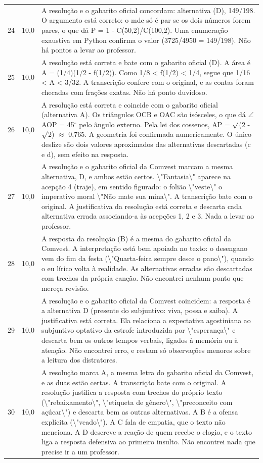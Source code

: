 \documentclass{article}%
\begin{document}
\begin{longtable}{@{}c c p{}@{}}
24 & 10,0 & A resolução e o gabarito oficial concordam: alternativa (D), 149/198. O argumento está correto: o mdc só é par se os dois números forem pares, o que dá P = 1 - C(50,2)/C(100,2). Uma enumeração exaustiva em Python confirma o valor (3725/4950 = 149/198). Não há pontos a levar ao professor. \\
25 & 10,0 & A resolução está correta e bate com o gabarito oficial (D). A área é A = (1/4)(1/2 - f(1/2)). Como 1/8 < f(1/2) < 1/4, segue que 1/16 < A < 3/32. A transcrição confere com o original, e as contas foram checadas com frações exatas. Não há ponto duvidoso. \\
26 & 10,0 & A resolução está correta e coincide com o gabarito oficial (alternativa A). Os triângulos OCB e OAC são isósceles, o que dá $\angle$AOP = 45$^\circ$ pelo ângulo externo. Pela lei dos cossenos, AP = $\surd$(2 - $\surd$2) $\approx$ 0,765. A geometria foi confirmada numericamente. O único deslize são dois valores aproximados das alternativas descartadas (c e d), sem efeito na resposta. \\
27 & 10,0 & A resolução e o gabarito oficial da Comvest marcam a mesma alternativa, D, e ambos estão certos. \textbackslash{}"Fantasia\textbackslash{}" aparece na acepção 4 (traje), em sentido figurado: o folião \textbackslash{}"veste\textbackslash{}" o imperativo moral \textbackslash{}"Não mate sua mina\textbackslash{}". A transcrição bate com o original. A justificativa da resolução está correta e descarta cada alternativa errada associando{-}a às acepções 1, 2 e 3. Nada a levar ao professor. \\
28 & 10,0 & A resposta da resolução (B) é a mesma do gabarito oficial da Comvest. A interpretação está bem apoiada no texto: o desengano vem do fim da festa (\textbackslash{}"Quarta{-}feira sempre desce o pano\textbackslash{}"), quando o eu lírico volta à realidade. As alternativas erradas são descartadas com trechos da própria canção. Não encontrei nenhum ponto que mereça revisão. \\
29 & 10,0 & A resolução e o gabarito oficial da Comvest coincidem: a resposta é a alternativa D (presente do subjuntivo: viva, possa e saiba). A justificativa está correta. Ela relaciona a expectativa agostiniana ao subjuntivo optativo da estrofe introduzida por \textbackslash{}"esperança\textbackslash{}" e descarta bem os outros tempos verbais, ligados à memória ou à atenção. Não encontrei erro, e restam só observações menores sobre a leitura dos distratores. \\
30 & 10,0 & A resolução marca A, a mesma letra do gabarito oficial da Comvest, e as duas estão certas. A transcrição bate com o original. A resolução justifica a resposta com trechos do próprio texto (\textbackslash{}"rebaixamento\textbackslash{}", \textbackslash{}"etiqueta de gênero\textbackslash{}", \textbackslash{}"preconceito com açúcar\textbackslash{}") e descarta bem as outras alternativas. A B é a ofensa explícita (\textbackslash{}"veado\textbackslash{}"). A C fala de empatia, que o texto não menciona. A D descreve a reação de quem recebe o elogio, e o texto liga a resposta defensiva ao primeiro insulto. Não encontrei nada que precise ir a um professor. \\

\end{longtable}
\end{document}
